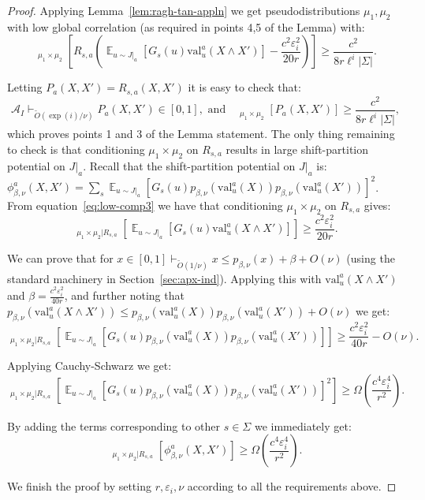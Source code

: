 \documentclass[11pt]{article}
\DeclareMathOperator*{\E}{\mathbb{E}}
\DeclareMathOperator*{\pE}{\widetilde{\mathbb{E}}}
\def \cA {\mathcal{A}}
\def \tO {\widetilde{O}}
\def \eps {{\varepsilon}}
\def \val {\mathrm{val}}
\theoremstyle{definition}
\begin{document}
\begin{proof}
Applying Lemma~\ref{lem:ragh-tan-appln} we get pseudodistributions $\mu_1,\mu_2$ with low global correlation (as required in points 4,5 of the Lemma) with:
\begin{equation}\label{eq:low-comp3}
\pE_{\mu_1 \times \mu_2}\left[R_{s,a} \left(\E_{u \sim J|_a}[G_s(u)\val^a_u(X \wedge X')] - \frac{c^2\eps_i^2}{20r}\right)\right] \geq \frac{c^2}{8r\ell^i|\Sigma|}.
\end{equation}

Letting $P_a(X,X') = R_{s,a}(X,X')$ it is easy to check that:
\[\cA_I \vdash_{\tO(\exp(i)/\nu)} P_a(X,X') \in [0,1], \text{ and }~~~ \pE_{\mu_1 \times \mu_2}[P_a(X,X')] \geq \frac{c^2}{8r\ell^i|\Sigma|},\]
which proves points 1 and 3 of the Lemma statement. The only thing remaining to check is that conditioning $\mu_1 \times \mu_2$ on $R_{s,a}$ results in large shift-partition potential on $J|_a$. Recall that the shift-partition potential on $J|_a$ is: $\phi^a_{\beta,\nu}(X,X') = \sum_s \E_{u \sim J|_a}[G_s(u)p_{\beta,\nu}(\val^a_u(X))p_{\beta,\nu}(\val^a_u(X'))]^2$. From equation~\eqref{eq:low-comp3} we have that conditioning $\mu_1 \times \mu_2$ on $R_{s,a}$ gives:
\[\pE_{\mu_1 \times \mu_2 | R_{s,a}}[\E_{u \sim J|_a}[G_s(u)\val^a_u(X \wedge X')]] \geq  \frac{c^2\eps_i^2}{20r}.\]

We can prove that for $x \in [0,1] \vdash_{\tO(1/\nu)} x \leq  p_{\beta,\nu}(x) + \beta + O(\nu)$ (using the standard machinery in Section~\ref{sec:apx-ind}). Applying this with $\val^a_u(X \wedge X')$ and $\beta = \frac{c^2\eps_i^2}{40r}$, and further noting that
$p_{\beta,\nu}(\val_u^a(X \wedge X')) \leq p_{\beta,\nu}(\val_u^a(X))p_{\beta,\nu}(\val_u^a(X')) + O(\nu)$ we get:
\[\pE_{\mu_1 \times \mu_2 | R_{s,a}}[\E_{u \sim J|_a}[G_s(u)p_{\beta,\nu}(\val_u^a(X))p_{\beta,\nu}(\val_u^a(X'))]] \geq  \frac{c^2\eps_i^2}{40r} - O(\nu).\]

Applying Cauchy-Schwarz we get:
\[\pE_{\mu_1 \times \mu_2 | R_{s,a}}[\E_{u \sim J|_a}[G_s(u)p_{\beta,\nu}(\val_u^a(X))p_{\beta,\nu}(\val_u^a(X'))]^2] \geq  \Omega\left(\frac{c^4\eps_i^4}{r^2}\right).\]

By adding the terms corresponding to other $s \in \Sigma$ we immediately get:
\begin{equation}\label{eq:potential-c0}
\pE_{\mu_1 \times \mu_2 | R_{s,a}}[\phi_{\beta,\nu}^a(X,X')] \geq \Omega\left(\frac{c^4\eps_i^4}{r^2}\right).
\end{equation}

We finish the proof by setting $r,\eps_i,\nu$ according to all the requirements above.


\end{proof}
\end{document}
